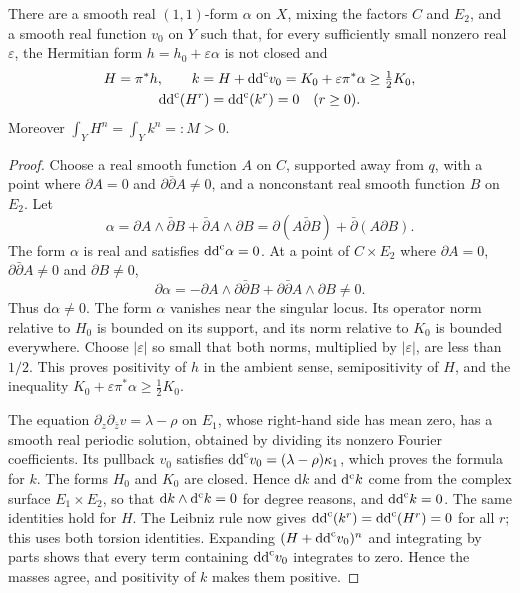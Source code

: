 \begin{proposition}\label{prop:cuspidal-nonclosed-repair}
There are a smooth real $(1,1)$-form $\alpha$ on $X$, mixing the factors $C$ and $E_2$, and a smooth real function $v_0$ on $Y$ such that, for every sufficiently small nonzero real $\varepsilon$, the Hermitian form $h=h_0+\varepsilon\alpha$ is not closed and
\[
 \begin{gathered}
 H=\pi^*h,\qquad k=H+\mathrm{dd}^{\mathrm{c}} v_0=K_0+\varepsilon\pi^*\alpha\geq\tfrac12K_0,\\
 \mathrm{dd}^{\mathrm{c}}(H^r)=\mathrm{dd}^{\mathrm{c}}(k^r)=0\quad(r\geq0).
 \end{gathered}
\]
Moreover $\int_YH^n=\int_Yk^n=:M>0$.
\end{proposition}
\begin{proof}
Choose a real smooth function $A$ on $C$, supported away from $q$, with a point where $\partial A=0$ and $\partial\bar\partial A\ne0$, and a nonconstant real smooth function $B$ on $E_2$. Let
\[
 \alpha=\partial A\wedge\bar\partial B+\bar\partial A\wedge\partial B
        =\partial(A\bar\partial B)+\bar\partial(A\partial B).
\]
The form $\alpha$ is real and satisfies $\mathrm{dd}^{\mathrm{c}}\alpha=0$. At a point of $C\times E_2$ where $\partial A=0$, $\partial\bar\partial A\ne0$ and $\partial B\ne0$,
\[
 \partial\alpha=-\partial A\wedge\partial\bar\partial B
                    +\partial\bar\partial A\wedge\partial B\ne0.
\]
Thus $\mathrm d\alpha\ne0$. The form $\alpha$ vanishes near the singular locus. Its operator norm relative to $H_0$ is bounded on its support, and its norm relative to $K_0$ is bounded everywhere. Choose $|\varepsilon|$ so small that both norms, multiplied by $|\varepsilon|$, are less than $1/2$. This proves positivity of $h$ in the ambient sense, semipositivity of $H$, and the inequality $K_0+\varepsilon\pi^*\alpha\geq\tfrac12K_0$.

The equation $\partial_z\partial_{\bar z}v=\lambda-\rho$ on $E_1$, whose right-hand side has mean zero, has a smooth real periodic solution, obtained by dividing its nonzero Fourier coefficients. Its pullback $v_0$ satisfies $\mathrm{dd}^{\mathrm{c}} v_0=(\lambda-\rho)\kappa_1$, which proves the formula for $k$. The forms $H_0$ and $K_0$ are closed. Hence $\mathrm dk$ and $\mathrm d^{\mathrm c} k$ come from the complex surface $E_1\times E_2$, so that $\mathrm dk\wedge\mathrm d^{\mathrm c} k=0$ for degree reasons, and $\mathrm{dd}^{\mathrm{c}} k=0$. The same identities hold for $H$. The Leibniz rule now gives $\mathrm{dd}^{\mathrm{c}}(k^r)=\mathrm{dd}^{\mathrm{c}}(H^r)=0$ for all $r$; this uses both torsion identities. Expanding $(H+\mathrm{dd}^{\mathrm{c}} v_0)^n$ and integrating by parts shows that every term containing $\mathrm{dd}^{\mathrm{c}} v_0$ integrates to zero. Hence the masses agree, and positivity of $k$ makes them positive.
\end{proof}

